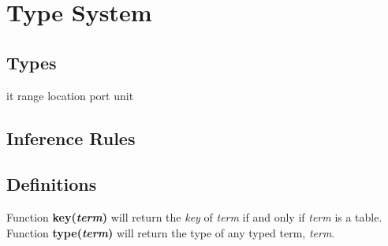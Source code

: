 
\section{Type System}

\subsection{Types}
it\newline
range\newline
location\newline
port\newline
unit\newline
\subsection{Inference Rules}
\subsection*{Definitions}
Function \textbf{key(\textit{term})} will return the \textit{key} of \textit{term} if and only if \textit{term} is a table. \newline
Function \textbf{type(\textit{term})} will return the type of any typed term, \textit{term}.

